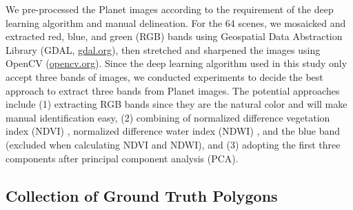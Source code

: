 \documentclass[preprint,12pt,authoryear]{elsarticle}
\begin{document}
We pre-processed the Planet images according to the requirement of the deep learning algorithm and manual delineation. For the 64 scenes, we mosaicked and extracted red, blue, and green (RGB) bands using Geospatial Data Abstraction Library (GDAL, \url{gdal.org}), then stretched and sharpened the images using OpenCV (\url{opencv.org}). Since the deep learning algorithm used in this study only accept three bands of images, we conducted experiments to decide the best approach to extract three bands from Planet images. The potential approaches include (1) extracting RGB bands since they are the natural color and will make manual identification easy, (2) combining of normalized difference vegetation index (NDVI) \citep{rouse1974monitoring}, normalized difference water index (NDWI) \citep{mcfeeters1996use}, and the blue band (excluded when calculating NDVI and NDWI), and (3) adopting the first three components after principal component analysis (PCA). 







\subsection{Collection of Ground Truth Polygons}
\label{subsec_collect_groundtruth}
\end{document}
